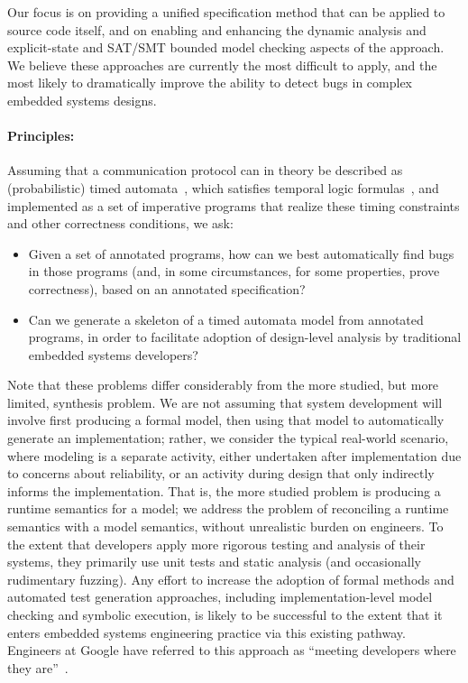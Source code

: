 Our focus is on providing a unified specification method that can be
applied to source code itself, and on enabling and enhancing the dynamic analysis and
explicit-state and SAT/SMT bounded model
checking aspects of the approach.  We believe these approaches are
currently the most difficult to apply, and the most likely to
dramatically improve the ability to detect bugs in complex embedded
systems designs.

\paragraph{Principles:} Assuming that a communication protocol can in theory be described
as (probabilistic) timed automata~\cite{AD1994:TCS},
which satisfies temporal logic
formulas~\cite{BLM2017:LNCS}, and implemented as a set of
imperative programs that realize these timing constraints and other
correctness conditions, we ask:
\begin{itemize}[labelsep=3pt,leftmargin=12pt]
\item Given a set of annotated programs, how can we best automatically
  find bugs in those programs (and, in some circumstances, for some
  properties, prove correctness), based on an annotated
  specification?
\item Can we generate a skeleton of a timed automata model from 
  annotated programs, in order to facilitate adoption of design-level analysis by 
  traditional embedded systems developers? 
\end{itemize}

Note that these problems differ considerably from the more studied,
but more limited, synthesis problem.  We are not assuming that
system development will involve first producing a formal model, then
using that model to automatically generate an implementation; rather,
we consider the typical real-world scenario, where modeling is a
separate activity, either undertaken after implementation due to
concerns about reliability, or an activity during design that only
indirectly informs the implementation.  That is, the more studied
problem is producing a runtime semantics for a model; we address the
problem of reconciling a runtime semantics with a model semantics,
without unrealistic burden on engineers.  To the extent that developers apply more rigorous
testing and analysis of their systems, they primarily use unit tests
and static analysis (and occasionally rudimentary  fuzzing).  Any
effort to increase the
adoption of formal methods and automated test generation
approaches, including implementation-level model checking and symbolic
execution, is likely to be successful to the extent that it enters
embedded systems engineering practice via this existing pathway.  Engineers at Google have referred to this
approach as ``meeting developers where they are''~\cite{meeting}.


